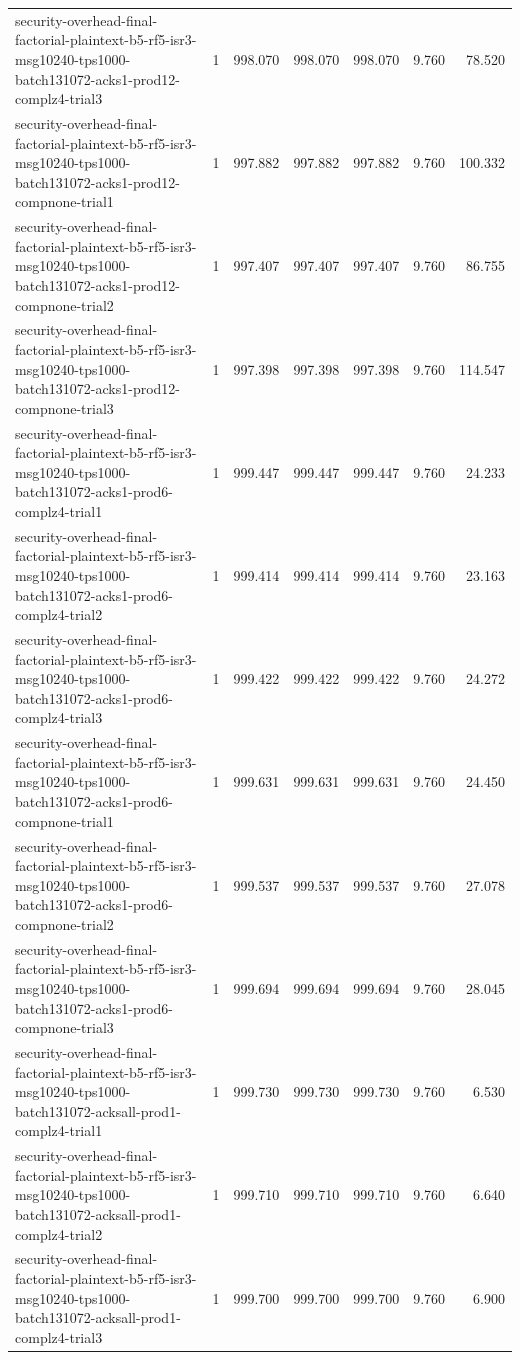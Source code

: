 \begin{tabular}{lrrrrrr}
security-overhead-final-factorial-plaintext-b5-rf5-isr3-msg10240-tps1000-batch131072-acks1-prod12-complz4-trial3 & 1 & 998.070 & 998.070 & 998.070 & 9.760 & 78.520 \\
security-overhead-final-factorial-plaintext-b5-rf5-isr3-msg10240-tps1000-batch131072-acks1-prod12-compnone-trial1 & 1 & 997.882 & 997.882 & 997.882 & 9.760 & 100.332 \\
security-overhead-final-factorial-plaintext-b5-rf5-isr3-msg10240-tps1000-batch131072-acks1-prod12-compnone-trial2 & 1 & 997.407 & 997.407 & 997.407 & 9.760 & 86.755 \\
security-overhead-final-factorial-plaintext-b5-rf5-isr3-msg10240-tps1000-batch131072-acks1-prod12-compnone-trial3 & 1 & 997.398 & 997.398 & 997.398 & 9.760 & 114.547 \\
security-overhead-final-factorial-plaintext-b5-rf5-isr3-msg10240-tps1000-batch131072-acks1-prod6-complz4-trial1 & 1 & 999.447 & 999.447 & 999.447 & 9.760 & 24.233 \\
security-overhead-final-factorial-plaintext-b5-rf5-isr3-msg10240-tps1000-batch131072-acks1-prod6-complz4-trial2 & 1 & 999.414 & 999.414 & 999.414 & 9.760 & 23.163 \\
security-overhead-final-factorial-plaintext-b5-rf5-isr3-msg10240-tps1000-batch131072-acks1-prod6-complz4-trial3 & 1 & 999.422 & 999.422 & 999.422 & 9.760 & 24.272 \\
security-overhead-final-factorial-plaintext-b5-rf5-isr3-msg10240-tps1000-batch131072-acks1-prod6-compnone-trial1 & 1 & 999.631 & 999.631 & 999.631 & 9.760 & 24.450 \\
security-overhead-final-factorial-plaintext-b5-rf5-isr3-msg10240-tps1000-batch131072-acks1-prod6-compnone-trial2 & 1 & 999.537 & 999.537 & 999.537 & 9.760 & 27.078 \\
security-overhead-final-factorial-plaintext-b5-rf5-isr3-msg10240-tps1000-batch131072-acks1-prod6-compnone-trial3 & 1 & 999.694 & 999.694 & 999.694 & 9.760 & 28.045 \\
security-overhead-final-factorial-plaintext-b5-rf5-isr3-msg10240-tps1000-batch131072-acksall-prod1-complz4-trial1 & 1 & 999.730 & 999.730 & 999.730 & 9.760 & 6.530 \\
security-overhead-final-factorial-plaintext-b5-rf5-isr3-msg10240-tps1000-batch131072-acksall-prod1-complz4-trial2 & 1 & 999.710 & 999.710 & 999.710 & 9.760 & 6.640 \\
security-overhead-final-factorial-plaintext-b5-rf5-isr3-msg10240-tps1000-batch131072-acksall-prod1-complz4-trial3 & 1 & 999.700 & 999.700 & 999.700 & 9.760 & 6.900 \\

\end{tabular}
